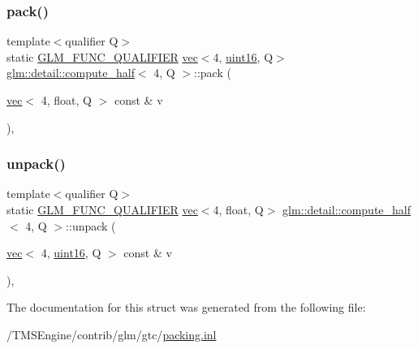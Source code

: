 \subsubsection{\texorpdfstring{pack()}{pack()}}
{\footnotesize\ttfamily template$<$qualifier Q$>$ \\
static \hyperlink{setup_8hpp_a33fdea6f91c5f834105f7415e2a64407}{G\+L\+M\+\_\+\+F\+U\+N\+C\+\_\+\+Q\+U\+A\+L\+I\+F\+I\+ER} \hyperlink{structglm_1_1vec}{vec}$<$4, \hyperlink{namespaceglm_1_1detail_a47b2a7d006d187338e8031a352d1ce56}{uint16}, Q$>$ \hyperlink{structglm_1_1detail_1_1compute__half}{glm\+::detail\+::compute\+\_\+half}$<$ 4, Q $>$\+::pack (\begin{DoxyParamCaption}\item[{\hyperlink{structglm_1_1vec}{vec}$<$ 4, float, Q $>$ const \&}]{v }\end{DoxyParamCaption})\hspace{0.3cm}{\ttfamily [inline]}, {\ttfamily [static]}}

\mbox{\label{structglm_1_1detail_1_1compute__half_3_014_00_01_q_01_4_a0e7bc963552dffae7fc20fc5dc2e810e}} 
\subsubsection{\texorpdfstring{unpack()}{unpack()}}
{\footnotesize\ttfamily template$<$qualifier Q$>$ \\
static \hyperlink{setup_8hpp_a33fdea6f91c5f834105f7415e2a64407}{G\+L\+M\+\_\+\+F\+U\+N\+C\+\_\+\+Q\+U\+A\+L\+I\+F\+I\+ER} \hyperlink{structglm_1_1vec}{vec}$<$4, float, Q$>$ \hyperlink{structglm_1_1detail_1_1compute__half}{glm\+::detail\+::compute\+\_\+half}$<$ 4, Q $>$\+::unpack (\begin{DoxyParamCaption}\item[{\hyperlink{structglm_1_1vec}{vec}$<$ 4, \hyperlink{namespaceglm_1_1detail_a47b2a7d006d187338e8031a352d1ce56}{uint16}, Q $>$ const \&}]{v }\end{DoxyParamCaption})\hspace{0.3cm}{\ttfamily [inline]}, {\ttfamily [static]}}



The documentation for this struct was generated from the following file\+:\begin{DoxyCompactItemize}
\item 
/\+T\+M\+S\+Engine/contrib/glm/gtc/\hyperlink{packing_8inl}{packing.\+inl}\end{DoxyCompactItemize}
